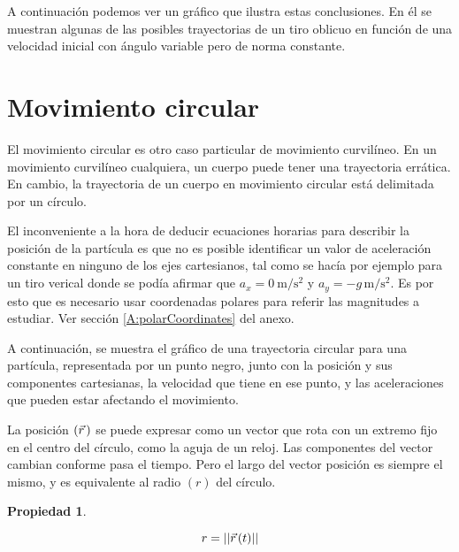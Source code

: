 \documentclass[a5paper,12pt,twoside]{book}
\newtheorem{prop}{{Propiedad}}[chapter]
\begin{document}
A continuación podemos ver un gráfico que ilustra estas conclusiones.
En él se muestran algunas de las posibles trayectorias de un tiro oblicuo en función de una velocidad inicial con ángulo variable pero de norma constante.

\begin{center}
    \def\svgwidth{\linewidth}
    
\end{center}


\section{Movimiento circular}
\label{sec:circularMotion}

El movimiento circular es otro caso particular de movimiento curvilíneo.
En un movimiento curvilíneo cualquiera, un cuerpo puede tener una trayectoria errática.
En cambio, la trayectoria de un cuerpo en movimiento circular está delimitada por un círculo.

El inconveniente a la hora de deducir ecuaciones horarias para describir la posición de la partícula es que no es posible identificar un valor de aceleración constante en ninguno de los ejes cartesianos, tal como se hacía por ejemplo para un tiro verical donde se podía afirmar que $a_x=\SI{0}{\metre\per\second^2}$ y $a_y=-g\,\si{\metre\per\second^2}$.
Es por esto que es necesario usar {coordenadas polares} para referir las magnitudes a estudiar.
Ver sección \ref{A:polarCoordinates} del anexo.

A continuación, se muestra el gráfico de una trayectoria circular para una partícula, representada por un punto negro, junto con la posición y sus componentes cartesianas, la velocidad que tiene en ese punto, y las aceleraciones que pueden estar afectando el movimiento.

\begin{center}
    \def\svgwidth{\linewidth}
    
\end{center}

La posición $(\vec{r}\hspace{0.05cm})$ se puede expresar como un vector que rota con un extremo fijo en el centro del círculo, como la aguja de un reloj.
Las componentes del vector cambian conforme pasa el tiempo.
Pero el largo del vector posición es siempre el mismo, y es equivalente al radio $(r)$ del círculo.

\begin{mdframed}[style=MyFrame1]
    \begin{prop}
        \label{prop:circularMovRadius}
    \end{prop}
    \begin{equation*}
        r = {\left|\left| {\vec{r}\hspace{0.05cm}(t)} \right|\right|}
    \end{equation*}
\end{mdframed}
\end{document}
